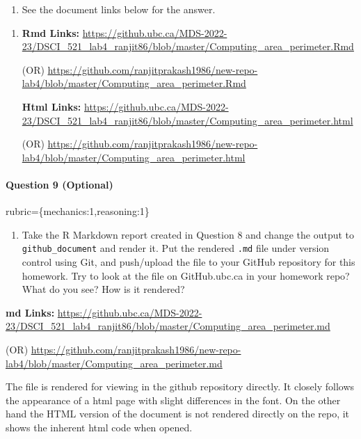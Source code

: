 \documentclass[
]{article}
\providecommand{\tightlist}{%
  \setlength{\itemsep}{0pt}\setlength{\parskip}{0pt}}
\begin{document}
\begin{enumerate}
\def\labelenumi{\arabic{enumi}.}
\tightlist
\item
  See the document links below for the answer.
\end{enumerate}

\begin{enumerate}
\def\labelenumi{\arabic{enumi}.}
\setcounter{enumi}{1}
\item
  \textbf{Rmd Links:}
  \url{https://github.ubc.ca/MDS-2022-23/DSCI_521_lab4_ranjit86/blob/master/Computing_area_perimeter.Rmd}

  (OR)
  \url{https://github.com/ranjitprakash1986/new-repo-lab4/blob/master/Computing_area_perimeter.Rmd}

  \textbf{Html Links:}
  \url{https://github.ubc.ca/MDS-2022-23/DSCI_521_lab4_ranjit86/blob/master/Computing_area_perimeter.html}

  (OR)
  \url{https://github.com/ranjitprakash1986/new-repo-lab4/blob/master/Computing_area_perimeter.html}
\end{enumerate}

\begin{alert alert-info}
\hypertarget{question-9-optional}{%
\paragraph{Question 9 (Optional)}\label{question-9-optional}}

rubric=\{mechanics:1,reasoning:1\}

\begin{enumerate}
\def\labelenumi{\arabic{enumi}.}
\tightlist
\item
  Take the R Markdown report created in Question 8 and change the output
  to \texttt{github\_document} and render it. Put the rendered
  \texttt{.md} file under version control using Git, and push/upload the
  file to your GitHub repository for this homework. Try to look at the
  file on GitHub.ubc.ca in your homework repo? What do you see? How is
  it rendered?
\end{enumerate}
\end{alert alert-info}

\textbf{md Links:}
\url{https://github.ubc.ca/MDS-2022-23/DSCI_521_lab4_ranjit86/blob/master/Computing_area_perimeter.md}

(OR)
\url{https://github.com/ranjitprakash1986/new-repo-lab4/blob/master/Computing_area_perimeter.md}

The file is rendered for viewing in the github repository directly. It
closely follows the appearance of a html page with slight differences in
the font. On the other hand the HTML version of the document is not
rendered directly on the repo, it shows the inherent html code when
opened.
\end{document}

